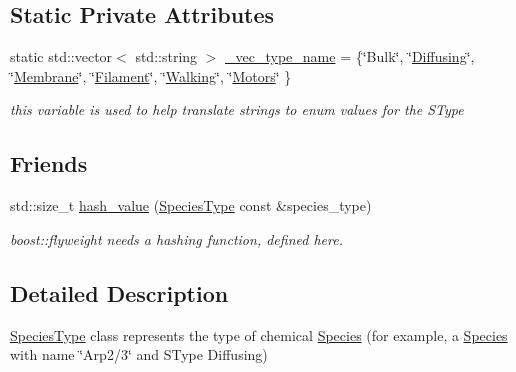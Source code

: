 \subsection*{Static Private Attributes}
\begin{DoxyCompactItemize}
\item 
static std\-::vector$<$ std\-::string $>$ \hyperlink{group__Chemistry_ga8a4ff9d2899dab92d059bd59b9b5bf13}{\-\_\-vec\-\_\-type\-\_\-name} = \{\char`\"{}Bulk\char`\"{}, \char`\"{}\hyperlink{group__Chemistry_gga49104ff0a7d4118feb179c2f1c906f12a6fd38f35f0769a1078f3985c73141f32}{Diffusing}\char`\"{}, \char`\"{}\hyperlink{group__Chemistry_gga49104ff0a7d4118feb179c2f1c906f12abfefb8fd60296e6af745b2c55a00d3e7}{Membrane}\char`\"{}, \char`\"{}\hyperlink{group__Chemistry_gga49104ff0a7d4118feb179c2f1c906f12a1b756abdd29940ec0263e68c81a47bad}{Filament}\char`\"{}, \char`\"{}\hyperlink{group__Chemistry_gga49104ff0a7d4118feb179c2f1c906f12a7632ff25e7a1c2e6df8c2003b738fe72}{Walking}\char`\"{}, \char`\"{}\hyperlink{group__Chemistry_gga49104ff0a7d4118feb179c2f1c906f12a264a8b043a2ec5b11bc7ee5962486742}{Motors}\char`\"{} \}
\begin{DoxyCompactList}\small\item\em this variable is used to help translate strings to enum values for the S\-Type \end{DoxyCompactList}\end{DoxyCompactItemize}
\subsection*{Friends}
\begin{DoxyCompactItemize}
\item 
std\-::size\-\_\-t \hyperlink{group__Chemistry_gad48f13e05211225475379004632c68f2}{hash\-\_\-value} (\hyperlink{classSpeciesType}{Species\-Type} const \&species\-\_\-type)
\begin{DoxyCompactList}\small\item\em boost\-::flyweight needs a hashing function, defined here. \end{DoxyCompactList}\end{DoxyCompactItemize}


\subsection{Detailed Description}
\hyperlink{classSpeciesType}{Species\-Type} class represents the type of chemical \hyperlink{classSpecies}{Species} (for example, a \hyperlink{classSpecies}{Species} with name \char`\"{}\-Arp2/3\char`\"{} and S\-Type Diffusing) 

